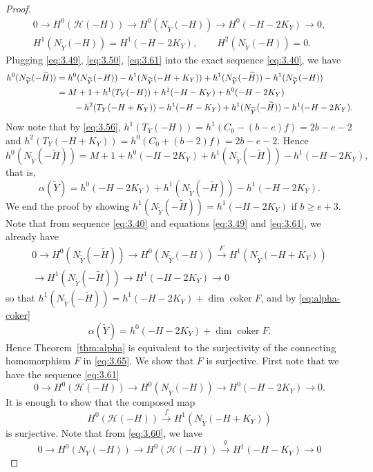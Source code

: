 \documentclass[11pt,reqno]{amsart}
\theoremstyle{plain}
\theoremstyle{definition}
\newcommand{\coker}{\operatorname{coker}}
\newcommand{\Yt}{\widetilde{Y}}
\newcommand{\Ht}{\widetilde{H}}
\newcommand{\NY}{N_{Y}}
\newcommand{\NYt}{N_{\Yt}}
\newcommand{\Hc}{\mathcal{H}}
\begin{document}
\begin{proof}
\begin{equation}\label{eq:3.61}
\begin{gathered}
0\to H^0(\Hc(-H))\to H^0(\NYt(-H))\to H^0(-H-2K_Y)\to 0,\\
H^1(\NYt(-H))=H^1(-H-2K_Y),\qquad H^2(\NYt(-H))=0 .
\end{gathered}
\end{equation}
Plugging \eqref{eq:3.49}, \eqref{eq:3.50}, \eqref{eq:3.61} into the exact sequence \eqref{eq:3.40}, we have
\begin{align}
h^0(\NYt(-\Ht))&=h^0(\NYt(-H))-h^1(\NYt(-H+K_Y))+h^1(\NYt(-\Ht))-h^1(\NYt(-H))\label{eq:3.62}\\
&=M+1+h^1(T_Y(-H))+h^1(-H-K_Y)+h^0(-H-2K_Y)\notag\\
&\qquad-h^2(T_Y(-H+K_Y))-h^1(-H-K_Y)+h^1(\NYt(-\Ht))-h^1(-H-2K_Y).\label{eq:3.63}
\end{align}
Now note that by \eqref{eq:3.56}, $h^1(T_Y(-H))=h^1(C_0-(b-e)f)=2b-e-2$ and $h^2(T_Y(-H+K_Y))=h^0(C_0+(b-2)f)=2b-e-2$. Hence
\begin{equation}\label{eq:3.64}
h^0(\NYt(-\Ht))=M+1+h^0(-H-2K_Y)+h^1(\NYt(-\Ht))-h^1(-H-2K_Y),
\end{equation}
that is,
\begin{equation}\label{eq:alpha-coker}
\alpha(\Yt)=h^0(-H-2K_Y)+h^1(\NYt(-\Ht))-h^1(-H-2K_Y).
\end{equation}
We end the proof by showing $h^1(\NYt(-\Ht))=h^1(-H-2K_Y)$ if $b\ge e+3$. Note that from sequence \eqref{eq:3.40} and equations \eqref{eq:3.49} and \eqref{eq:3.61}, we already have
\begin{multline}\label{eq:3.65}
0\to H^0(\NYt(-\Ht))\to H^0(\NYt(-H))\xrightarrow{\ F\ } H^1(\NYt(-H+K_Y))\\
\to H^1(\NYt(-\Ht))\to H^1(-H-2K_Y)\to 0
\end{multline}
so that $h^1(\NYt(-\Ht))=h^1(-H-2K_Y)+\dim\coker F$, and by \eqref{eq:alpha-coker}
\begin{equation}\label{eq:alpha-F}
\alpha(\Yt)=h^0(-H-2K_Y)+\dim\coker F .
\end{equation}
Hence Theorem~\ref{thm:alpha} is equivalent to the surjectivity of the connecting homomorphism $F$ in \eqref{eq:3.65}. We show that $F$ is surjective. First note that we have the sequence \eqref{eq:3.61}
\[
0\to H^0(\Hc(-H))\to H^0(\NYt(-H))\to H^0(-H-2K_Y)\to 0 .
\]
It is enough to show that the composed map
\[
H^0(\Hc(-H))\xrightarrow{\ f\ } H^1(\NYt(-H+K_Y))
\]
is surjective. Note that from \eqref{eq:3.60}, we have
\[
0\to H^0(\NY(-H))\to H^0(\Hc(-H))\xrightarrow{\ g\ } H^1(-H-K_Y)\to 0
\]
\end{proof}
\end{document}
